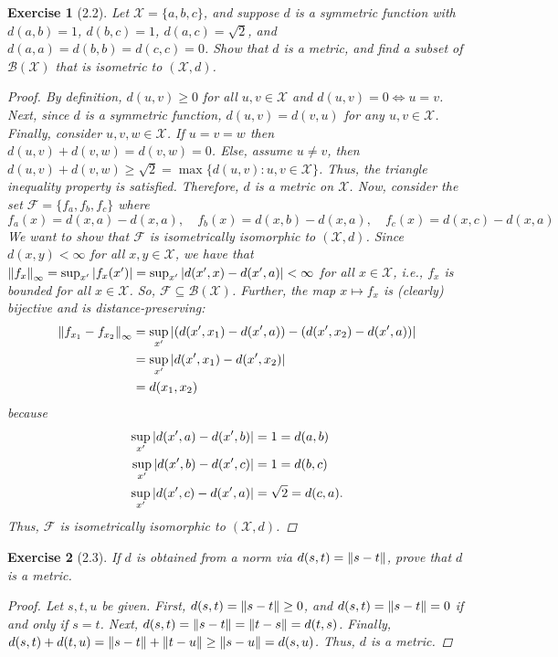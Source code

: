 \documentclass[11pt]{article}
\newtheorem{exercise}{Exercise}
\begin{document}
\begin{exercise}[2.2]
	Let $\mathcal{X} = \{a,b,c \}$, and suppose $d$ is a symmetric function with $d(a,b)=1$, $d(b,c) = 1$, $d(a,c) = \sqrt{2}$, and $d(a,a) = d(b,b) = d(c,c) = 0$. Show that $d$ is a metric, and find a subset of $\mathcal{B}(\mathcal{X})$ that is isometric to $(\mathcal{X},d)$. 
	
	\begin{proof}
	By definition, $d(u,v) \geq 0$ for all $u,v\in \mathcal{X}$ and $d(u,v) = 0 \iff u=v$. Next, since $d$ is a symmetric function, $d(u,v) = d(v,u)$ for any $u,v\in \mathcal{X}$. Finally, consider $u,v,w\in \mathcal{X}$. If $u=v=w$ then $d(u,v) + d(v,w) = d(v,w) = 0$. Else, assume $u\neq v$, then $d(u,v) + d(v,w) \geq \sqrt{2} = \max\{ d(u,v) : u,v\in \mathcal{X} \}$. Thus, the triangle inequality property is satisfied. Therefore, $d$ is a metric on $\mathcal{X}$. Now, consider the set $\mathcal{F} = \{f_a, f_b, f_c\}$ where 
	\begin{equation*}
	f_a(x) = d(x,a) - d(x,a), \quad f_b(x) = d(x,b) - d(x,a) ,\quad f_c(x) = d(x,c) - d(x,a) 
	\end{equation*}
	We want to show that $\mathcal{F}$ is isometrically isomorphic to $(\mathcal{X},d)$. Since $d(x,y) < \infty$ for all $x,y\in \mathcal{X}$, we have that $\norm{f_x}_\infty = \sup_{x'}\abs{f_x(x')} = \sup_{x'}\abs{d(x',x) - d(x',a)}< \infty$ for all $x\in \mathcal{X}$, i.e., $f_x$ is bounded for all $x\in \mathcal{X}$. So, $\mathcal{F} \subseteq \mathcal{B}(\mathcal{X})$. Further, the map $x\mapsto f_x$ is (clearly) bijective and is distance-preserving:
	\begin{align*}
	\norm{f_{x_1} - f_{x_2}}_\infty 
	&= \sup_{x'} \abs{(d(x',x_1) - d(x',a)) - (d(x',x_2) - d(x',a))} \\
	&= \sup_{x'} \abs{d(x',x_1) - d(x',x_2)}\\
	&= d(x_1,x_2)
	\end{align*}
	because 
	\begin{align*}
	\sup_{x'} \abs{d(x',a) - d(x',b)} &= 1 = d(a,b) \\
 	\sup_{x'} \abs{d(x',b) - d(x',c)} &= 1 = d(b,c)\\
	\sup_{x'} \abs{d(x',c) - d(x',a)} &= \sqrt{2} = d(c,a). 
	\end{align*}
	Thus, $\mathcal{F}$ is isometrically isomorphic to $(\mathcal{X},d)$. 
	\end{proof}
\end{exercise}

\begin{exercise}[2.3]
	If $d$ is obtained from a norm via $d(s,t) = \norm{s-t}$, prove that $d$ is a metric.
	
	\begin{proof}
		Let $s,t,u$ be given. First, $d(s,t) = \norm{s-t} \geq 0$, and $d(s,t) = \norm{s-t} = 0$ if and only if $s=t$. Next, $d(s,t) = \norm{s-t} = \norm{t-s} = d(t,s)$. Finally, $d(s,t) + d(t,u) = \norm{s-t} + \norm{t-u} \geq \norm{s-u} = d(s,u)$. Thus, $d$ is a metric.
	\end{proof}
\end{exercise}
\end{document}
